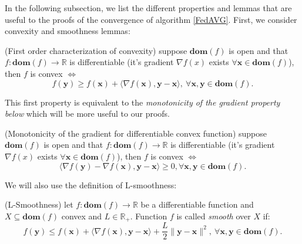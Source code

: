 In the following subsection, we list the different properties and lemmas that are useful to the proofs of the convergence of algorithm \ref{FedAVG}. First, we consider convexity and smoothness lemmas: 

\begin{property}
    (First order characterization of convexity) suppose $\bm{dom}(f)$ is open and that $f:\bm{dom}(f) \rightarrow \mathbb{R}$ is differentiable (it's gradient $\nabla f(x)$ exists $\forall \bm{x} \in \bm{dom}(f)$), then $f$ is convex $\iff$
    \[ f(\bm{y}) \geq f(\bm{x}) + \langle \nabla f(\bm{x}) , \bm{y}-\bm{x} \rangle ,~  \forall \bm{x},\bm{y} \in \bm{dom}(f). \]
    \label{convexity}
\end{property}
\noindent
This first property is equivalent to the \textit{monotonicity of the gradient property below} which will be more useful to our proofs.

\begin{property}
    (Monotonicity of the gradient for differentiable convex function) suppose $\bm{dom}(f)$ is open and that $f:\bm{dom}(f) \rightarrow \mathbb{R}$ is differentiable (it's gradient $\nabla f(x)$ exists $\forall \bm{x} \in \bm{dom}(f)$), then $f$ is convex $\iff$
    \[  \langle \nabla f(\bm{y}) - \nabla f(\bm{x}) , \bm{y}-\bm{x} \rangle \geq 0 ,  \forall \bm{x},\bm{y} \in \bm{dom}(f). \]
    \label{monotone_grad}
\end{property}

\noindent
We will also use the definition of L-smoothness:
\begin{property}
    (L-Smoothness) let $f:\bm{dom}(f) \rightarrow \mathbb{R}$ be a differentiable function and $X \subseteq \bm{dom}(f)$ convex and $L\in\mathbb{R}_+$. Function $f$ is called \textit{smooth} over $X$ if:
    \[  f(\bm{y}) \leq f(\bm{x}) +  \langle \nabla f(\bm{x}) , \bm{y}-\bm{x} \rangle +  \frac{L}{2} \|\bm{y}-\bm{x} \|^2 ,~  \forall \bm{x},\bm{y} \in \bm{dom}(f). \]
    \label{lsmooth}
\end{property}